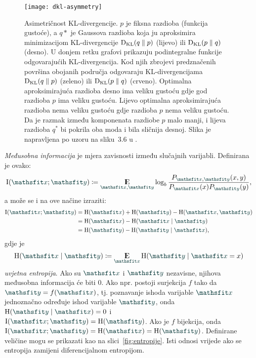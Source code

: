 \documentclass[utf8, diplomski, lmodern]{fer}
\begin{document}
\begin{figure}
	\centering
	\texttt{[image: dkl-asymmetry]}
	\caption{Asimetričnost KL-divergencije. $p$ je fiksna razdioba (funkcija gustoće), a $q*$ je Gaussova razdioba koja ju aproksimira minimizacijom KL-divergencije $\Dkl{q}{p}$ (lijevo) ili $\Dkl{p}{q}$ (desno). U donjem retku grafovi prikazuju podintegralne funkcije odgovarajućih KL-divergencija. Kod njih zbrojevi predznačenih površina obojanih područja odgovaraju KL-divergencijama $\Dkl{q}{p}$ (zeleno) ili $\Dkl{p}{q}$ (crveno). Optimalna aproksimirajuća razdioba desno ima veliku gustoću gdje god razdioba $p$ ima veliku gustoću. Lijevo optimalna aproksimirajuća razdioba nema veliku gustoću gdje razdioba $p$ nema veliku gustoću. Da je razmak između komponenata razdiobe $p$ malo manji, i lijeva razdioba $q^*$ bi pokrila oba moda i bila sličnija desnoj. Slika je napravljena po uzoru na sliku~3.6 u \citet{Goodfellow:2016:DL}.}
	\label{fig:dkl-asymmetry}
\end{figure}

\emph{Međusobna informacija} je mjera zavisnosti između slučajnih varijabli. Definirana je ovako:
\begin{align}
\I\del{\rvar x;\rvar y} \coloneqq \E_{\rvar x, \rvar y} \log_b\frac{P_{\rvar x, \rvar y}(x, y)}{P_{\rvar x}(x)P_{\rvar y}(y)} \text{,}
\label{eq:mutinf}
\end{align}
a može se i na ove načine izraziti:
\begin{align}
\I(\rvar x;\rvar y)
&= \H(\rvar x)+\H(\rvar y)-\H(\rvar x, \rvar y) \\
&= \H(\rvar x)-\H(\rvar x\mid \rvar y) \\ 
&= \H(\rvar y)-\H(\rvar y\mid\rvar x) \text{,}
\label{eq:mutinf2}
\end{align}
gdje je
\begin{align}
\H(\rvar x\mid \rvar y) \coloneqq \E_{\rvar x} \H(\rvar y\mid \rvar x=x)
\label{eq:condentropy}
\end{align}
\emph{uvjetna entropija}. Ako su $\rvar x$ i $\rvar y$ nezavisne, njihova međusobna informacija će biti $0$. Ako npr. postoji surjekcija $f$ tako da $\rvar y=f(\rvar x)$, tj. poznavanje ishoda varijable $\rvar x$ jednoznačno određuje ishod varijable $\rvar y$, onda $\H(\rvar y\mid\rvar x)=0$ i $\I(\rvar x;\rvar y) = \H(\rvar y)$. Ako je $f$ bijekcija, onda $\I(\rvar x;\rvar y) = \H(\rvar x) = \H(\rvar y)$. Definirane veličine mogu se prikazati kao na slici~\ref{fig:entropije}. Isti odnosi vrijede ako se entropija zamijeni diferencijalnom entropijom.
\end{document}
